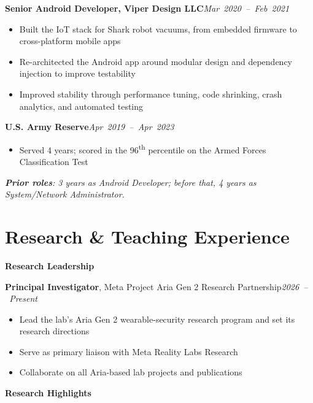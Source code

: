 \documentclass[10pt]{article}
\newcommand{\entry}[2]{%
 \par\needspace{3\baselineskip}\vspace{12pt}%
 {\noindent\textbf{#1}\hfill\mbox{\small\itshape #2}\par}%
}
\newcommand{\thread}[1]{%
 \par\needspace{3\baselineskip}\vspace{14pt}%
 {\noindent\fontsize{11}{13}\selectfont\bfseries #1\par}%
}
\newcommand{\project}[3]{%
 \par\needspace{3\baselineskip}\vspace{10pt}%
 {\noindent\hspace*{1.8em}\textbf{#1}#2\hfill\mbox{\small\itshape #3}\par}%
}
\newcommand{\cvsection}[1]{\needspace{5\baselineskip}\section*{#1}}
\begin{document}
\entry{Senior Android Developer, Viper Design LLC}{Mar 2020 -- Feb 2021}
\begin{itemize}
 \item Built the IoT stack for Shark robot vacuums, from embedded firmware to cross-platform mobile apps
 \item Re-architected the Android app around modular design and dependency injection to improve testability
 \item Improved stability through performance tuning, code shrinking, crash analytics, and automated testing
\end{itemize}

\entry{U.S. Army Reserve}{Apr 2019 -- Apr 2023}
\begin{itemize}
 \item Served 4 years; scored in the 96\textsuperscript{th} percentile on the Armed Forces Classification Test
\end{itemize}

\vspace{9pt}
\noindent
{\textit{\textbf{Prior roles}: 3 years as Android Developer; before that, 4 years as System/Network Administrator.}}

\cvsection{Research \& Teaching Experience}
\thread{Research Leadership}
\project{Principal Investigator}{, Meta Project Aria Gen 2 Research Partnership}{2026 -- Present}
\begin{itemize}[leftmargin=3em]
 \item Lead the lab's Aria Gen 2 wearable-security research program and set its research directions
 \item Serve as primary liaison with Meta Reality Labs Research
 \item Collaborate on all Aria-based lab projects and publications
\end{itemize}

\thread{Research Highlights}
\end{document}
